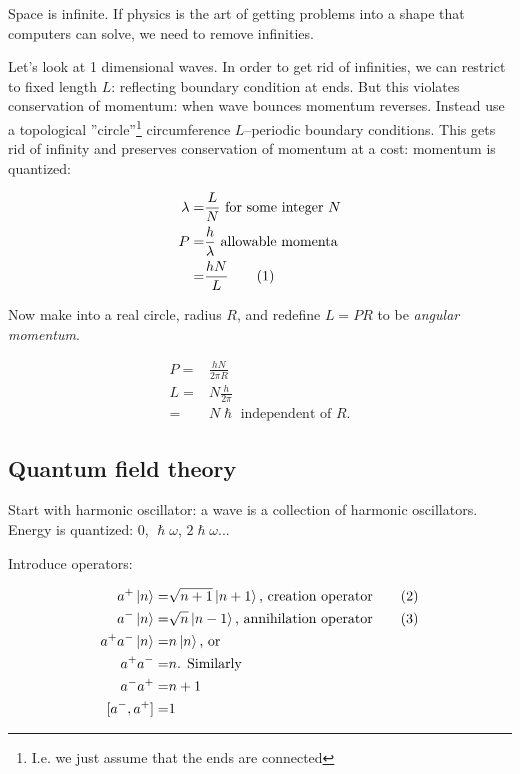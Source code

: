 \documentclass[]{article}
\newcommand\numberthis{\addtocounter{equation}{1}\tag{\theequation}}
\begin{document}
Space is infinite. If physics is the art of getting problems into a shape that computers can solve, we need to remove infinities.

Let's look at 1 dimensional waves. In order to get rid of infinities, we can restrict to fixed length $L$: reflecting boundary condition at ends. But this violates conservation of momentum: when wave bounces momentum reverses. Instead use a topological ''circle''\footnote{I.e. we just assume that the ends are connected} circumference $L$--periodic boundary conditions. This gets rid of infinity and preserves conservation of momentum at a cost: momentum is quantized: 

\begin{align*}
	\lambda =& \frac{L}{N} \text{ for some integer $N$}\\
	P =& \frac{h}{\lambda} \text{ allowable momenta}\\
	=& \frac{h N}{L} \numberthis \label{eq:momenta:finit:volume}
\end{align*}

Now make into a real circle, radius $R$, and redefine $L=PR$ to be \emph{angular momentum}.

\begin{align*}
	P =& \frac{h N}{2 \pi R}\\
	L =& N \frac{h}{2 \pi}\\
	=& N \hslash \text{ independent of $R$.}
\end{align*}

\subsection{Quantum field theory}

Start with harmonic oscillator: a wave is a collection of harmonic oscillators. Energy is quantized: 0, $\hslash \omega$, $2\hslash \omega$...

Introduce operators:

\begin{align*}
	a^+ \ket{n} =& \sqrt{n+1} \ket{n+1} \text{, creation operator} \numberthis \label{eq:creation}\\
	a^- \ket{n} =& \sqrt{n} \ket{n-1} \text{, annihilation operator} \numberthis \label{eq:annihilation} \\
	a^+ a^- \ket{n} =& n \ket{n} \text{, or}\\
	a^+ a^-  =& n \text{. Similarly}\\
	a^- a^+  =& n+1\\
	[a^-, a^+] =& 1
\end{align*}
\end{document}
